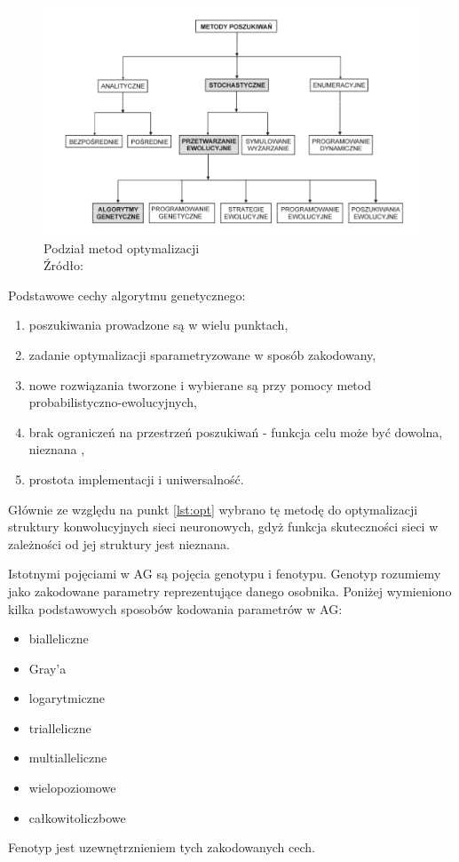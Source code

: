 \begin{figure}[h!tb]
	 \centering
	 \includegraphics[width = 0.8\linewidth]{img/optymalizacja}
	 \caption{Podział metod optymalizacji \\
              Źródło: \cite{bialaszewski2012}}
	 \label{fig:klas_opt}
\end{figure}

Podstawowe cechy algorytmu genetycznego:
\begin{enumerate}
	\item poszukiwania prowadzone są w wielu punktach,
	\item zadanie optymalizacji sparametryzowane w sposób zakodowany,
	\item nowe rozwiązania tworzone i wybierane są przy pomocy metod probabilistyczno-ewolucyjnych,
	\item brak ograniczeń na przestrzeń poszukiwań - funkcja celu może być dowolna, nieznana \label{lst:opt},
	\item prostota implementacji i uniwersalność.
\end{enumerate}

Głównie ze względu na punkt \ref{lst:opt} wybrano tę metodę do optymalizacji struktury konwolucyjnych sieci neuronowych, gdyż funkcja skuteczności sieci w zależności od jej struktury jest nieznana.

Istotnymi pojęciami w AG są pojęcia genotypu i fenotypu.
Genotyp rozumiemy jako zakodowane parametry reprezentujące danego osobnika.
Poniżej wymieniono kilka podstawowych sposobów kodowania parametrów w AG:
\begin{itemize}
	\item bialleliczne
	\item Gray’a
	\item logarytmiczne
	\item trialleliczne
	\item multialleliczne
	\item wielopoziomowe
	\item całkowitoliczbowe
\end{itemize}
Fenotyp jest uzewnętrznieniem tych zakodowanych cech.

